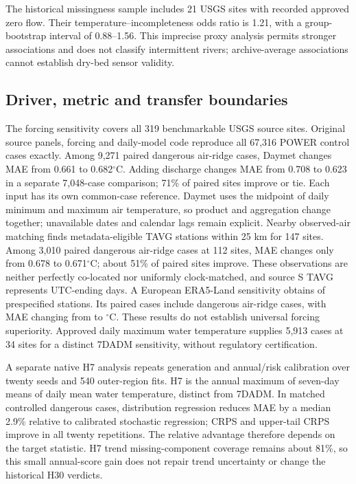 \documentclass[draft,linenumbers]{agujournal2025}
\begin{document}


The historical missingness sample includes 21 USGS sites with recorded approved zero flow. Their temperature--incompleteness odds ratio is 1.21, with a group-bootstrap interval of 0.88--1.56. This imprecise proxy analysis permits stronger associations and does not classify intermittent rivers; archive-average associations cannot establish dry-bed sensor validity.

\subsection{Driver, metric and transfer boundaries}
The forcing sensitivity covers all 319 benchmarkable USGS source sites. Original source panels, forcing and daily-model code reproduce all 67,316 POWER control cases exactly. Among 9,271 paired dangerous air-ridge cases, Daymet changes MAE from 0.661 to 0.682$^{\circ}$C. Adding discharge changes MAE from 0.708 to 0.623 in a separate 7,048-case comparison; 71\% of paired sites improve or tie. Each input has its own common-case reference. Daymet uses the midpoint of daily minimum and maximum air temperature, so product and aggregation change together; unavailable dates and calendar lags remain explicit. Nearby observed-air matching finds metadata-eligible TAVG stations within 25 km for 147 sites. Among 3,010 paired dangerous air-ridge cases at 112 sites, MAE changes only from 0.678 to 0.671$^{\circ}$C; about 51\% of paired sites improve. These observations are neither perfectly co-located nor uniformly clock-matched, and source S TAVG represents UTC-ending days. A European ERA5-Land sensitivity obtains \REuropeStations{} of \REuropeRequested{} prespecified stations. Its \REuropeCases{} paired cases include \REuropeAirCases{} dangerous air-ridge cases, with MAE changing from \REuropePowerMAE{} to \REuropeEraMAE{}$^{\circ}$C. These results do not establish universal forcing superiority. Approved daily maximum water temperature supplies 5,913 cases at 34 sites for a distinct 7DADM sensitivity, without regulatory certification.

A separate native H7 analysis repeats generation and annual/risk calibration over twenty seeds and 540 outer-region fits. H7 is the annual maximum of seven-day means of daily mean water temperature, distinct from 7DADM. In matched controlled dangerous cases, distribution regression reduces MAE by a median 2.9\% relative to calibrated stochastic regression; CRPS and upper-tail CRPS improve in all twenty repetitions. The relative advantage therefore depends on the target statistic. H7 trend missing-component coverage remains about 81\%, so this small annual-score gain does not repair trend uncertainty or change the historical H30 verdicts.
\end{document}
